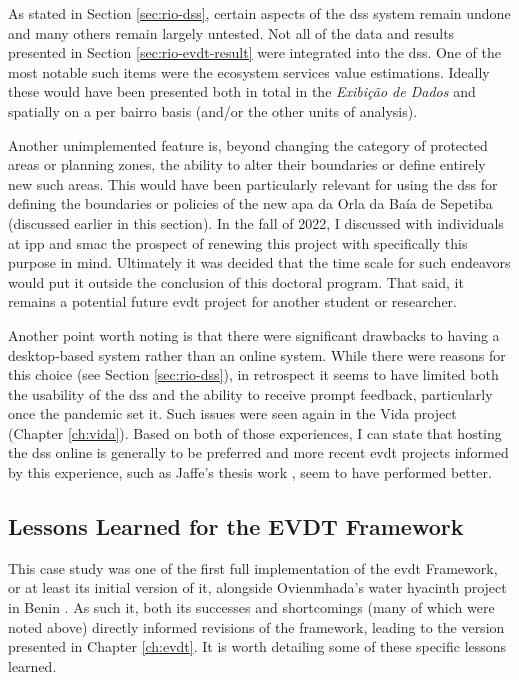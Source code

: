 As stated in Section \ref{sec:rio-dss}, certain aspects of the \ac{dss} system remain undone and many others remain largely untested. Not all of the data and results presented in Section \ref{sec:rio-evdt-result} were integrated into the \ac{dss}. One of the most notable such items were the ecosystem services value estimations. Ideally these would have been presented both in total in the \textit{Exibição de Dados} and spatially on a per bairro basis (and/or the other units of analysis).

Another unimplemented feature is, beyond changing the category of protected areas or planning zones, the ability to alter their boundaries or define entirely new such areas. This would have been particularly relevant for using the \ac{dss} for defining the boundaries or policies of the new \ac{apa} da Orla da Baía de Sepetiba (discussed earlier in this section). In the fall of 2022, I discussed with individuals at \ac{ipp} and \ac{smac} the prospect of renewing this project with specifically this purpose in mind. Ultimately it was decided that the time scale for such endeavors would put it outside the conclusion of this doctoral program. That said, it remains a potential future \ac{evdt} project for another student or researcher. 

Another point worth noting is that there were significant drawbacks to having a desktop-based system rather than an online system. While there were reasons for this choice (see Section \ref{sec:rio-dss}), in retrospect it seems to have limited both the usability of the \ac{dss} and the ability to receive prompt feedback, particularly once the pandemic set it. Such issues were seen again in the Vida project (Chapter \ref{ch:vida}). Based on both of those experiences, I can state that hosting the \ac{dss} online is generally to be preferred and more recent \ac{evdt} projects informed by this experience, such as Jaffe's thesis work \cite{jaffeEnvironmentalEconomicSystems2022}, seem to have performed better.  

\subsection{Lessons Learned for the EVDT Framework} \label{sec:rio-lessons-learned}

This case study was one of the first full implementation of the \ac{evdt} Framework, or at least its initial version of it, alongside Ovienmhada's water hyacinth project in Benin \cite{ovienmhadaInclusiveDesignEarth2021}. As such it, both its successes and shortcomings (many of which were noted above) directly informed revisions of the framework, leading to the version presented in Chapter \ref{ch:evdt}. It is worth detailing some of these specific lessons learned.


